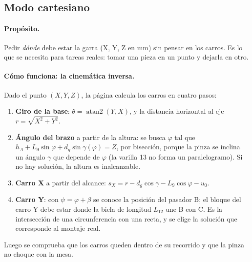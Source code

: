 \documentclass[a4paper,11pt]{article}
\begin{document}
\subsection{Modo cartesiano}

\paragraph{Propósito.} Pedir \emph{dónde} debe estar la garra (X, Y, Z en mm) sin pensar en los carros. Es lo que se necesita para tareas reales: tomar una pieza en un punto y dejarla en otro.

\paragraph{Cómo funciona: la cinemática inversa.}
Dado el punto $(X, Y, Z)$, la página calcula los carros en cuatro pasos:
\begin{enumerate}
\item \textbf{Giro de la base}: $\theta = \operatorname{atan2}(Y, X)$, y la distancia horizontal al eje $r = \sqrt{X^2 + Y^2}$.
\item \textbf{Ángulo del brazo} a partir de la altura: se busca $\varphi$ tal que $h_A + L_9\sin\varphi + d_g\sin\gamma(\varphi) = Z$, por bisección, porque la pinza se inclina un ángulo $\gamma$ que depende de $\varphi$ (la varilla 13 no forma un paralelogramo). Si no hay solución, la altura es inalcanzable.
\item \textbf{Carro X} a partir del alcance: $s_X = r - d_g\cos\gamma - L_9\cos\varphi - u_0$.
\item \textbf{Carro Y}: con $\psi = \varphi + \beta$ se conoce la posición del pasador B; el bloque del carro Y debe estar donde la biela de longitud $L_{12}$ une B con C. Es la intersección de una circunferencia con una recta, y se elige la solución que corresponde al montaje real.
\end{enumerate}
Luego se comprueba que los carros queden dentro de su recorrido y que la pinza no choque con la mesa.
\end{document}
